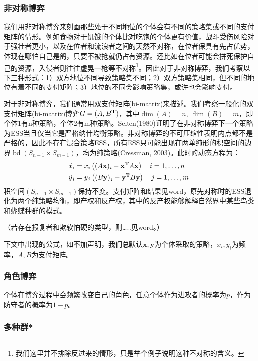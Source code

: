 \documentclass[lang=cn,12pt,a4paper]{elegantpaper}
\begin{document}
\subsubsection{非对称博弈}

我们用非对称博弈来刻画那些处于不同地位的个体会有不同的策略集或不同的支付矩阵的情形。例如食物对于饥饿的个体比对吃饱的个体更有价值，战斗受伤风险对于强壮者更小，以及在位者和流浪者之间的天然不对称，在位者保具有先占优势，体现在哪怕自己是鸽，只要不被抢就仍占有资源。还比如在位者可能会拼死保护自己的资源，入侵者则往往虚晃一枪等不对称\footnote{我们这里并不排除反过来的情形，只是举个例子说明这种不对称的含义。}。因此对于非对称博弈，我们考察以下三种形式：1）双方地位不同导致策略集不同；2）双方策略集相同，但不同的地位有着不同的支付矩阵；3）地位的不同会影响策略集，或许也会影响支付。

对于非对称博弈，我们通常用双支付矩阵(bi-matrix)来描述。我们考察一般化的双支付矩阵(bi-matrix)博弈$G=(A,B^{\bf{T}})$，其中$\dim(A)=n,\ \dim (B)=m$，即个体1有n种策略，个体2有m种策略。Selten(1980)证明了在非对称博弈下一个策略为ESS当且仅当它是严格纳什均衡策略。非对称博弈的不可压缩性表明内点都不是严格的，因此不存在混合策略ESS，所有ESS只可能出现在两单纯形的积空间的边界$\operatorname{bd} (S_{n-1} \times S_{m-1})$，均为纯策略(Cressman, 2003)。此时的动态方程为：
\begin{align}
&\dot{{x}_{i}}=x_{i}\left((A \mathbf{x})_{i}-\mathbf{x}^{\bf{T}}  A \mathbf{x}\right) \quad i=1, \ldots, n\\
&\dot{{y}_{j}}=y_{j}\left((B \mathbf{y})_{j}-\mathbf{y}^{\bf{T}}  B \mathbf{y}\right) \quad j=1, \ldots, m
\end{align}
积空间$ (S_{n-1} \times S_{m-1})$保持不变。支付矩阵和结果见word，原先对称时的ESS退化为两个纯策略均衡，即产权和反产权，其中的反产权能够解释自然界中某些鸟类和蝴蝶种群的模式。

（若存在报复者和欺软怕硬的类型，则……见word。）

下文中出现的公式，如不加声明，我们总默认$\mathbf{x},\mathbf{y}$为个体采取的策略，$x_i,y_i$为频率，$A,B$为支付矩阵。




\subsubsection{角色博弈}

个体在博弈过程中会频繁改变自己的角色，任意个体作为进攻者的概率为\(p\)，作为防守者的概率为\(1-p\)。

\subsubsection{多种群*}
\end{document}
